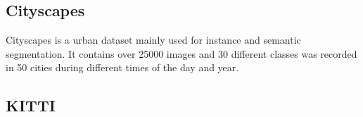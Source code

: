 \subsection{Cityscapes}
Cityscapes is a urban dataset mainly used for instance and semantic segmentation. It contains over 25000 images and 30 different classes was recorded in 50 cities during different times of the day and year.

\subsection{KITTI}


